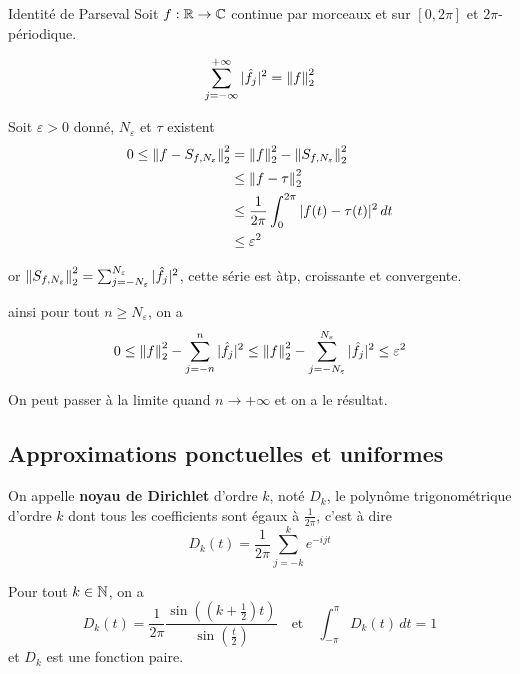\documentclass[a4paper,12pt]{article}
\begin{document}
\begin{corollaire}{Identité de Parseval}{}
    Soit $f: \mathbb{R} \to \mathbb{C}$ continue par morceaux et sur $[0, 2\pi]$ et $2\pi$-périodique.

    $$
    \sum_{j=-\infty}^{+\infty} |\hat{f_j}|^2 = \left\lVert f\right\rVert_2^2
    $$
\end{corollaire}

\begin{demonstration}
    Soit $\varepsilon > 0$ donné, $N_\varepsilon$ et $\tau$ existent
    \begin{align*}
        0 \leq \left\lVert f - S_{f,N_\varepsilon}\right\rVert_2^2 &= \left\lVert f\right\rVert_2^2 - \left\lVert S_{f,N_\varepsilon}\right\rVert_2^2 \\
        &\leq \left\lVert f - \tau\right\rVert_2^2 \\
        & \leq \frac{1}{2\pi} \int_0^{2\pi} |f(t) - \tau(t)|^2 \, dt \\
        &\leq \varepsilon^2
    \end{align*}

    or $\left\lVert S_{f,N_\varepsilon}\right\rVert_2^2 = \sum_{j=-N_\varepsilon}^{N_\varepsilon} |\hat{f_j}|^2$, cette série est àtp, croissante et convergente.

    ainsi pour tout $n \geq N_\varepsilon$, on a
    $$
    0 \leq \left\lVert f\right\rVert_2^2 - \sum_{j=-n}^n |\hat{f_j}|^2 \leq \left\lVert f\right\rVert_2^2 - \sum_{j=-N_\varepsilon}^{N_\varepsilon} |\hat{f_j}|^2 \leq \varepsilon^2
    $$

    On peut passer à la limite quand $n \to +\infty$ et on a le résultat.
\end{demonstration}

\subsection{Approximations ponctuelles et uniformes}

\begin{definition}
    On appelle \textbf{noyau de Dirichlet} d'ordre $k$, noté $D_k$, le polynôme trigonométrique d'ordre $k$ dont tous les coefficients sont égaux à $\frac{1}{2\pi}$, c'est à dire
    $$
    D_k(t) = \frac{1}{2\pi} \sum_{j=-k}^k e^{-ijt}
    $$
\end{definition}

\begin{proposition}{}{}
    Pour tout $k \in \mathbb{N}$, on a
    $$
    D_k(t) = \frac{1}{2\pi} \frac{\sin((k + \frac{1}{2})t)}{\sin(\frac{t}{2})} \quad \text{et} \quad \int_{-\pi}^{\pi} D_k(t) \, dt = 1
    $$
    et $D_k$ est une fonction paire.

\end{proposition}
\end{document}
